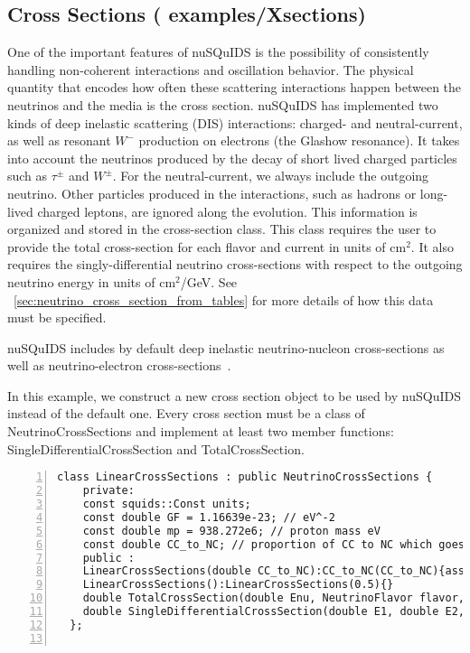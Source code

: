 \documentclass[3p,12pt]{elsarticle}
\newcommand{\ttf}{\ttfamily}
\begin{document}
\subsection{Cross Sections \textnormal{({\ttf
      examples/Xsections})}}

One of the important features of {\ttf nuSQuIDS} is the possibility of consistently handling non-coherent interactions and oscillation
behavior. The physical quantity that encodes how often these scattering
interactions happen between the neutrinos and the media is the cross
section.
{\ttf nuSQuIDS} has implemented two kinds of deep inelastic scattering (DIS) interactions: charged- and
neutral-current, as well as resonant $W^-$ production on electrons (the Glashow resonance). It takes into account
the neutrinos produced by the decay of short lived charged particles
such as $\tau^\pm$ and $W^\pm$. For the neutral-current, we always include
the outgoing neutrino.
Other particles produced in the interactions, such as hadrons or long-lived
charged leptons, are ignored along the evolution.
This information is organized and stored in the cross-section class.
This class requires the user to provide the total cross-section for
each flavor and current in units of cm$^2$. It also requires
the singly-differential neutrino cross-sections with respect to
the outgoing neutrino energy in units of cm$^2$/GeV.
See ~\ref{sec:neutrino_cross_section_from_tables} for more details of how this data must be specified. 

{\ttf nuSQuIDS} includes by default deep inelastic neutrino-nucleon
cross-sections as well as neutrino-electron
cross-sections~\citep{Gandhi:1998ri, CooperSarkar:2011pa}.

In this example, we construct a new cross section object to be used by
{\ttf nuSQuIDS} instead of the default one.
Every cross section must be a class of {\ttf NeutrinoCrossSections}
and implement at least two member functions:
{\ttf SingleDifferentialCrossSection} and {\ttf TotalCrossSection}.


\begin{lstlisting}[frame=leftline, numbers =
  left,breaklines=true,label = ex:sin1]
  class LinearCrossSections : public NeutrinoCrossSections {
    private:
    const squids::Const units;
    const double GF = 1.16639e-23; // eV^-2
    const double mp = 938.272e6; // proton mass eV
    const double CC_to_NC; // proportion of CC to NC which goes from 0 to 1.
    public :
    LinearCrossSections(double CC_to_NC):CC_to_NC(CC_to_NC){assert( CC_to_NC <= 1.0  && CC_to_NC >= 0.0 );}
    LinearCrossSections():LinearCrossSections(0.5){}
    double TotalCrossSection(double Enu, NeutrinoFlavor flavor, NeutrinoType neutype, Current current) const override;
    double SingleDifferentialCrossSection(double E1, double E2, NeutrinoFlavor flavor, NeutrinoType neutype, Current current) const override;
  };  
 
\end{lstlisting}
\end{document}
